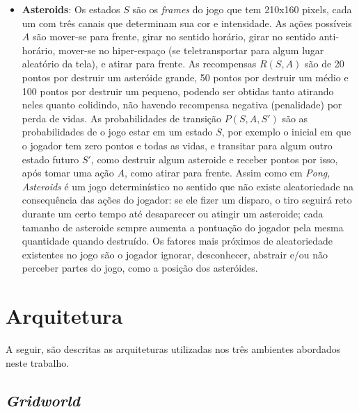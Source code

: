\begin{itemize}
\item \textbf{Asteroids}:
Os estados $S$ são os \textit{frames} do jogo que tem 210x160 pixels, cada um com três canais que determinam sua cor e intensidade.
As ações possíveis $A$ são mover-se para frente, girar no sentido horário, girar no sentido anti-horário, mover-se no hiper-espaço (se teletransportar para algum lugar aleatório da tela), e atirar para frente.
As recompensas $R(S,A)$ são de 20 pontos por destruir um asteróide grande, 50 pontos por destruir um médio e 100 pontos por destruir um pequeno, podendo ser obtidas tanto atirando neles quanto colidindo, não havendo recompensa negativa (penalidade) por perda de vidas.
As probabilidades de transição $P(S,A,S')$ são as probabilidades de o jogo estar em um estado $S$, por exemplo o inicial em que o jogador tem zero pontos e todas as vidas, e transitar para algum outro estado futuro $S'$, como destruir algum asteroide e receber pontos por isso, após tomar uma ação $A$, como atirar para frente.
Assim como em \textit{Pong}, \textit{Asteroids} é um jogo determinístico no sentido que não existe aleatoriedade na consequência das ações do jogador: se ele fizer um disparo, o tiro seguirá reto durante um certo tempo até desaparecer ou atingir um asteroide; cada tamanho de asteroide sempre aumenta a pontuação do jogador pela mesma quantidade quando destruído.
Os fatores mais próximos de aleatoriedade existentes no jogo são o jogador ignorar, desconhecer, abstrair e/ou não perceber partes do jogo, como a posição dos asteróides.
\end{itemize}


\section{Arquitetura}
\label{sec:arq}

A seguir, são descritas as arquiteturas utilizadas nos três ambientes abordados neste trabalho.

\subsection{\textit{Gridworld}}
\label{sec:arq_gw}

